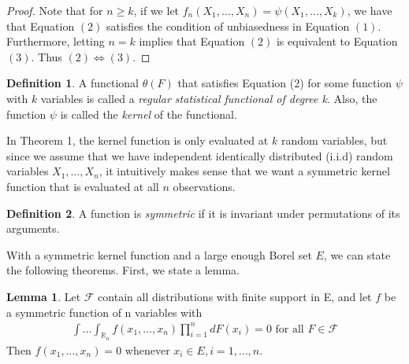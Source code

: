 \documentclass{article}
\newcommand{\R}{{\mathbb{R}}}
\theoremstyle{definition}
\newtheorem{Lemma}{Lemma}
\newtheorem{Def}{Definition}
\numberwithin{Def}{section}
\begin{document}
\begin{proof}
Note that for $n \geq k$, if we let $f_n(X_1, \dotsc, X_n) = \psi(X_1, \dotsc, X_k)$, we have that Equation $(2)$ satisfies the condition of unbiasedness in Equation $(1)$. Furthermore, letting $n=k$ implies that Equation $(2)$ is equivalent to Equation $(3)$. Thus $(2) \iff (3)$. 
\end{proof}

\begin{Def}
A functional $\theta(F)$ that satisfies Equation (2) for some function $\psi$ with $k$ variables is called a \textit{regular statistical functional of degree k}. Also, the function $\psi$ is called the \textit{kernel} of the functional. 
\end{Def}

In Theorem 1, the kernel function is only evaluated at $k$ random variables, but since we assume that we have independent identically distributed (i.i.d) random variables $X_1, \dotsc, X_n$, it intuitively makes sense that we want a symmetric kernel function that is evaluated at all $n$ observations. 

\begin{Def}
A function is \textit{symmetric} if it is invariant under permutations of its arguments. 
\end{Def}

With a symmetric kernel function and a large enough Borel set $E$, we can state the following theorems. First, we state a lemma.

\begin{Lemma}\label{lemA}
Let $\mathcal{F}$ contain all distributions with finite support in E, and let $f$ be a symmetric function of n variables with 
    \begin{align*}
        \int \dotsc \int_{\R_n} f(x_1, \dotsc, x_n) \prod_{i=1}^n dF(x_i) = 0 \text{ for all } F \in \mathcal{F}
    \end{align*}
    Then $f(x_1, \dotsc, x_n) = 0$ whenever $x_i \in E, i = 1, \dotsc, n$. 
\end{Lemma}
\end{document}
